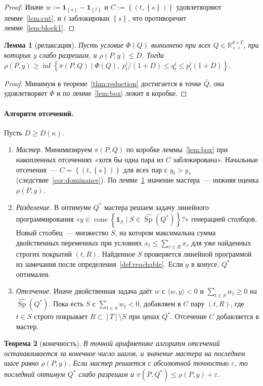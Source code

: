 \documentclass[a4paper,11pt]{article}
\theoremstyle{plain}
\newtheorem{theorem}{Теорема}[section]
\newtheorem{lemma}[theorem]{Лемма}
\theoremstyle{definition}
\theoremstyle{remark}
\newcommand{\R}{\mathbb{R}}
\newcommand{\set}[1]{\left\{ #1 \right\}}
\newcommand{\ip}[2]{\langle #1, #2\rangle} %
\newcommand{\Rpp}[1][2]{\R^{#1}_{++}} %
\DeclareMathOperator{\cone}{cone}
\DeclareMathOperator{\Sp}{Sp}
\begin{document}
\begin{proof}
    Иначе $w:=\mathbf 1_{\set s}-\mathbf 1_{\set t}$ и $C:=\set{(t,\set s)}$ удовлетворяют лемме~\ref{lem:cut}, и $t$ заблокирован $\set s$, что противоречит лемме~\ref{lem:block1}.
\end{proof}

\begin{lemma}[релаксация]\label{lem:relax}
    Пусть условие $\Phi(Q)$ выполнено при всех $Q\in\Rpp[d\times T]$, при которых $y$ слабо разрешим, и $\rho(P,y)\le D$. Тогда $\rho(P,y)\ge\inf\set{\pi(P,Q)\mid\Phi(Q),\ p^i_t/(1+D)\le q^i_t\le p^i_t(1+D)}$.
\end{lemma}

\begin{proof}
    Минимум в теореме~\ref{thm:reduction} достигается в точке $\bar Q$, она удовлетворяет $\Phi$ и по лемме~\ref{lem:box} лежит в коробке.
\end{proof}

\paragraph{Алгоритм отсечений.} Пусть $D\ge D(\kappa)$.
\begin{enumerate}
    \item \emph{Мастер.} Минимизируем $\pi(P,Q)$ по коробке леммы~\ref{lem:box} при накопленных отсечениях «хотя бы одна пара из $C$ заблокирована». Начальные отсечения~--- $C=\set{(t,\set s)}$ для всех пар с $y_t>y_s$ (следствие~\ref{cor:dominance}). По лемме~\ref{lem:relax} значение мастера~--- нижняя оценка $\rho(P,y)$.
    \item \emph{Разделение.} В оптимуме $Q^*$ мастера решаем задачу линейного программирования «$y\in\cone\set{\mathbf 1_S\mid S\in\widehat{\Sp}(Q^*)}$?» генерацией столбцов. Новый столбец~--- множество $S$, на котором максимальна сумма двойственных переменных при условиях $x_t\le\sum_{r\in R}x_r$ для уже найденных строгих покрытий $(t,R)$. Найденное $S$ проверяется линейной программой из замечания после определения~\ref{def:reachable}. Если $y$ в конусе, $Q^*$ оптимален.
    \item \emph{Отсечение.} Иначе двойственная задача даёт $w$ с $\ip{w}{y}<0$ и $\sum_{t\in S}w_t\ge0$ на $\widehat{\Sp}(Q^*)$. Пока есть $S$ с $\sum_{t\in S}w_t<0$, добавляем в $C$ пару $(t,R)$, где $t\in S$ строго покрывает $R\subset[T]\setminus S$ при ценах $Q^*$. Отсечение $C$ добавляется в мастер.
\end{enumerate}

\begin{theorem}[конечность]\label{thm:finite}
    В точной арифметике алгоритм отсечений останавливается за конечное число шагов, и значение мастера на последнем шаге равно $\rho(P,y)$. Если мастер решается с абсолютной точностью $\varepsilon$, то последний оптимум $Q^*$ слабо разрешим и $\pi(P,Q^*)\le\rho(P,y)+\varepsilon$.
\end{theorem}
\end{document}
